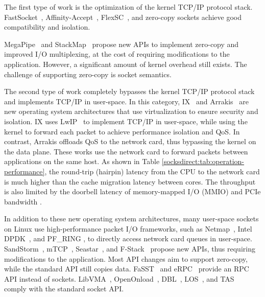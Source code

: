 The first type of work is the optimization of the kernel TCP/IP protocol stack. FastSocket~\cite{lin2016scalable}, Affinity-Accept~\cite{pesterev2012improving}, FlexSC~\cite{soares2010flexsc}, and zero-copy sockets \cite{thadani1995efficient,chu1996zero,linux-zero-copy} achieve good compatibility and isolation.

MegaPipe~\cite{han2012megapipe} and StackMap~\cite{yasukata2016stackmap} propose new APIs to implement zero-copy and improved I/O multiplexing, at the cost of requiring modifications to the application. However, a significant amount of kernel overhead still exists. The challenge of supporting zero-copy is socket semantics.

The second type of work completely bypasses the kernel TCP/IP protocol stack and implements TCP/IP in user-space. In this category, IX~\cite{belay2017ix} and Arrakis~\cite{peter2016arrakis} are new operating system architectures that use virtualization to ensure security and isolation. IX uses LwIP~\cite{dunkels2001design} to implement TCP/IP in user-space, while using the kernel to forward each packet to achieve performance isolation and QoS. In contrast, Arrakis offloads QoS to the network card, thus bypassing the kernel on the data plane. These works use the network card to forward packets between applications on the same host. As shown in Table \ref{socksdirect:tab:operation-performance}, the round-trip (hairpin) latency from the CPU to the network card is much higher than the cache migration latency between cores. The throughput is also limited by the doorbell latency of memory-mapped I/O (MMIO) and PCIe bandwidth \cite{neugebauer2018understanding,li2017kv}.

In addition to these new operating system architectures, many user-space sockets on Linux use high-performance packet I/O frameworks, such as Netmap~\cite{rizzo2012netmap}, Intel DPDK~\cite{dpdk}, and PF\_RING \cite{pf-ring}, to directly access network card queues in user-space. SandStorm~\cite{marinos2014network}, mTCP~\cite{jeong2014mtcp}, Seastar~\cite{seastar}, and F-Stack~\cite{fstack} propose new APIs, thus requiring modifications to the application. Most API changes aim to support zero-copy, while the standard API still copies data. FaSST~\cite{kalia2016fasst} and eRPC~\cite{kalia2018datacenter} provide an RPC API instead of sockets. LibVMA~\cite{libvma}, OpenOnload~\cite{openonload}, DBL~\cite{dbl}, LOS~\cite{huang2017high}, and TAS~\cite{taseurosys19} comply with the standard socket API.

